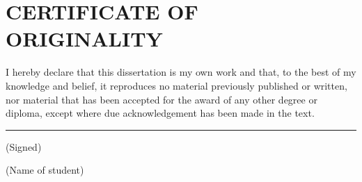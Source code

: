 \chapter*{\Large CERTIFICATE OF ORIGINALITY}
I hereby declare that this dissertation is my own work and that, to the best of my knowledge and belief, it reproduces no material previously published or written, nor material that has been accepted for the award of any other degree or diploma, except where due acknowledgement has been made in the text.

\vspace{25mm}
\noindent\rule{95mm}{0.4pt} (Signed)

\vspace{15mm}
\noindent\underline{\makebox[95mm][l]{\studentname}} (Name of student)
\clearpage
